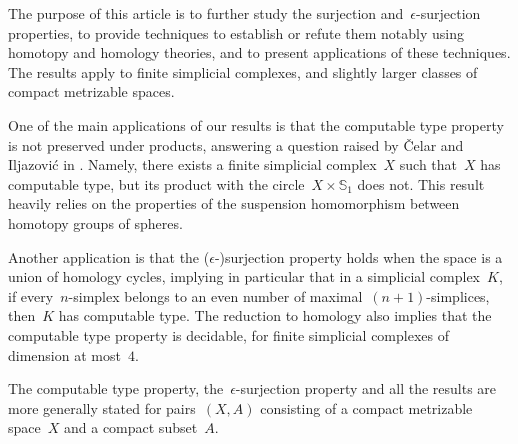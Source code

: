 \documentclass[english,11pt]{article}
\theoremstyle{plain}
\theoremstyle{remark}
\theoremstyle{definition}
\newcommand{\Sp}{\mathbb{S}}
\begin{document}
The purpose of this article is to further study the surjection and~$\epsilon$-surjection properties, to provide techniques to establish or refute them notably using homotopy and homology theories, and to present applications of these techniques. The results apply to finite simplicial complexes, and slightly larger classes of compact metrizable spaces.

One of the main applications of our results is that the computable type property is not preserved under products, answering a question raised by \v{C}elar and Iljazovi\'{c} in \cite{CI21}. Namely, there exists a finite simplicial complex~$X$ such that~$X$ has computable type, but its product with the circle~$X\times \Sp_1$ does not. This result heavily relies on the properties of the suspension homomorphism between homotopy groups of spheres.

Another application is that the ($\epsilon$-)surjection property holds when the space is a union of homology cycles, implying in particular that in a simplicial complex~$K$, if every~$n$-simplex belongs to an even number of maximal~$(n+1)$-simplices, then~$K$ has computable type. The reduction to homology also implies that the computable type property is decidable, for finite simplicial complexes of dimension at most~$4$.

The computable type property, the~$\epsilon$-surjection property and all the results are more generally stated for pairs~$(X,A)$ consisting of a compact metrizable space~$X$ and a compact subset~$A$.

% 
%
%
%
%
%
%
%
%
%
\end{document}
